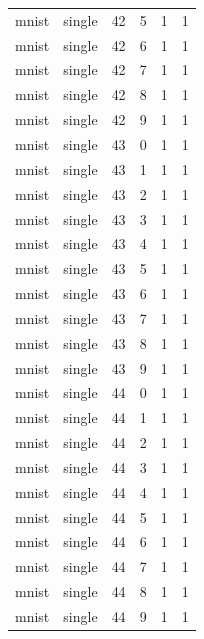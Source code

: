 \begin{tabular}{llrrrr}
mnist & single & 42 & 5 & 1 & 1 \\
mnist & single & 42 & 6 & 1 & 1 \\
mnist & single & 42 & 7 & 1 & 1 \\
mnist & single & 42 & 8 & 1 & 1 \\
mnist & single & 42 & 9 & 1 & 1 \\
mnist & single & 43 & 0 & 1 & 1 \\
mnist & single & 43 & 1 & 1 & 1 \\
mnist & single & 43 & 2 & 1 & 1 \\
mnist & single & 43 & 3 & 1 & 1 \\
mnist & single & 43 & 4 & 1 & 1 \\
mnist & single & 43 & 5 & 1 & 1 \\
mnist & single & 43 & 6 & 1 & 1 \\
mnist & single & 43 & 7 & 1 & 1 \\
mnist & single & 43 & 8 & 1 & 1 \\
mnist & single & 43 & 9 & 1 & 1 \\
mnist & single & 44 & 0 & 1 & 1 \\
mnist & single & 44 & 1 & 1 & 1 \\
mnist & single & 44 & 2 & 1 & 1 \\
mnist & single & 44 & 3 & 1 & 1 \\
mnist & single & 44 & 4 & 1 & 1 \\
mnist & single & 44 & 5 & 1 & 1 \\
mnist & single & 44 & 6 & 1 & 1 \\
mnist & single & 44 & 7 & 1 & 1 \\
mnist & single & 44 & 8 & 1 & 1 \\
mnist & single & 44 & 9 & 1 & 1 \\
\bottomrule
\end{tabular}
